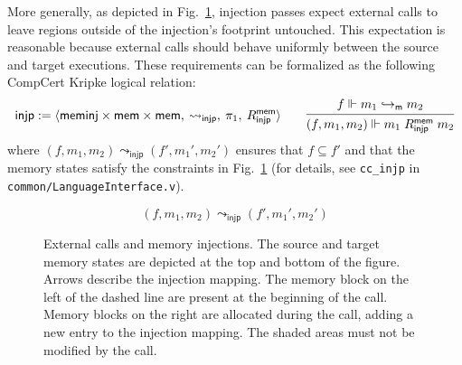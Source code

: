 \documentclass[draft,11pt]{report}
\newcommand{\kw}[1]{\ensuremath{ \mathsf{#1} }}
\begin{document}
More generally,
as depicted in Fig.~\ref{fig:injp},
injection passes expect external calls
to leave regions outside of the injection's footprint untouched.
This expectation is reasonable because
external calls
should behave uniformly between the source and target executions.
These requirements can be formalized as the
following CompCert Kripke logical relation:
\[
  \kw{injp} :=
    \langle
      \kw{meminj} \times \kw{mem} \times \kw{mem}, \:
      {\leadsto_\kw{injp}}, \:
      \pi_1, \:
      R^\kw{mem}_\kw{injp}
    \rangle
  \qquad
  \begin{prooftree}
    \hypo{f \Vdash m_1 \hookrightarrow_\kw{m} m_2}
    \infer1{(f, m_1, m_2) \Vdash m_1 \mathrel{R^\kw{mem}_\kw{injp}} m_2}
  \end{prooftree}
\]
where $(f, m_1, m_2) \leadsto_\kw{injp} (f', m_1', m_2')$
ensures that $f \subseteq f'$ and that the memory states
satisfy the constraints in Fig.~\ref{fig:injp}
(for details,
see \texttt{cc\_injp} in \texttt{common/LanguageInterface.v}).

\begin{figure} %
  \[ (f, m_1, m_2) \leadsto_\kw{injp} (f', m_1', m_2') \]
  \caption{External calls and memory injections.
    The source and target memory states are
    depicted at the top and bottom
    of the figure. Arrows describe the injection mapping.
    The memory block on the left of the dashed line
    are present at the beginning of the call.
    Memory blocks on the right
    are allocated during the call,
    adding a new entry to the injection mapping.
    The shaded areas must not be modified by the call.
  }
  \label{fig:injp}
\end{figure}
\end{document}
